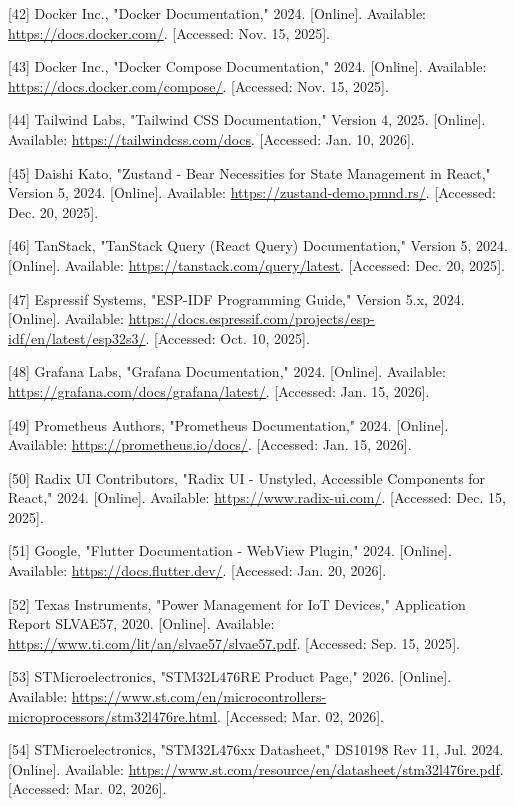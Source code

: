 \documentclass[a4paper]{extarticle}
\begin{document}
{[}42{]} Docker Inc., "Docker Documentation," 2024. {[}Online{]}.
Available: \url{https://docs.docker.com/}. {[}Accessed: Nov. 15,
2025{]}.

{[}43{]} Docker Inc., "Docker Compose Documentation," 2024.
{[}Online{]}. Available: \url{https://docs.docker.com/compose/}.
{[}Accessed: Nov. 15, 2025{]}.

{[}44{]} Tailwind Labs, "Tailwind CSS Documentation," Version 4, 2025.
{[}Online{]}. Available: \url{https://tailwindcss.com/docs}.
{[}Accessed: Jan. 10, 2026{]}.

{[}45{]} Daishi Kato, "Zustand - Bear Necessities for State Management
in React," Version 5, 2024. {[}Online{]}. Available:
\url{https://zustand-demo.pmnd.rs/}. {[}Accessed: Dec. 20, 2025{]}.

{[}46{]} TanStack, "TanStack Query (React Query) Documentation," Version
5, 2024. {[}Online{]}. Available:
\url{https://tanstack.com/query/latest}. {[}Accessed: Dec. 20, 2025{]}.

{[}47{]} Espressif Systems, "ESP-IDF Programming Guide," Version 5.x,
2024. {[}Online{]}. Available:
\url{https://docs.espressif.com/projects/esp-idf/en/latest/esp32s3/}.
{[}Accessed: Oct. 10, 2025{]}.

{[}48{]} Grafana Labs, "Grafana Documentation," 2024. {[}Online{]}.
Available: \url{https://grafana.com/docs/grafana/latest/}. {[}Accessed:
Jan. 15, 2026{]}.

{[}49{]} Prometheus Authors, "Prometheus Documentation," 2024.
{[}Online{]}. Available: \url{https://prometheus.io/docs/}. {[}Accessed:
Jan. 15, 2026{]}.

{[}50{]} Radix UI Contributors, "Radix UI - Unstyled, Accessible
Components for React," 2024. {[}Online{]}. Available:
\url{https://www.radix-ui.com/}. {[}Accessed: Dec. 15, 2025{]}.

{[}51{]} Google, "Flutter Documentation - WebView Plugin," 2024.
{[}Online{]}. Available: \url{https://docs.flutter.dev/}. {[}Accessed:
Jan. 20, 2026{]}.

{[}52{]} Texas Instruments, "Power Management for IoT Devices,"
Application Report SLVAE57, 2020. {[}Online{]}. Available:
\url{https://www.ti.com/lit/an/slvae57/slvae57.pdf}. {[}Accessed: Sep.
15, 2025{]}.

{[}53{]} STMicroelectronics, "STM32L476RE Product Page," 2026.
{[}Online{]}. Available:
\url{https://www.st.com/en/microcontrollers-microprocessors/stm32l476re.html}.
{[}Accessed: Mar. 02, 2026{]}.

{[}54{]} STMicroelectronics, "STM32L476xx Datasheet," DS10198 Rev 11,
Jul. 2024. {[}Online{]}. Available:
\url{https://www.st.com/resource/en/datasheet/stm32l476re.pdf}.
{[}Accessed: Mar. 02, 2026{]}.
\end{document}
